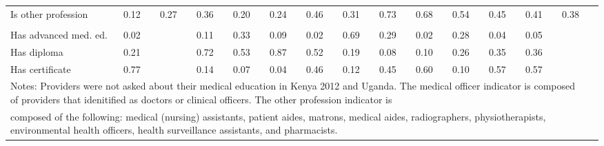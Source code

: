 \begin{tabular}{l*{14}{c}}
Is other profession&           {0.12}&        {0.27}&  {0.36}&  {0.20}&    {0.24}&        {0.46}&        {0.31}&        {0.73}&        {0.68}&        {0.54}&       {0.45}&       {0.41}&       {0.38}\\
&   {}\\
Has advanced med. ed.&         {0.02}&        {}&  {0.11}&  {0.33}&    {0.09}&        {0.02}&        {0.69}&        {0.29}&        {0.02}&        {0.28}&       {0.04}&       {0.05}&       {}\\
Has diploma&                           {0.21}&        {}&  {0.72}&  {0.53}&    {0.87}&        {0.52}&        {0.19}&        {0.08}&        {0.10}&        {0.26}&       {0.35}&       {0.36}&       {}\\
Has certificate&                       {0.77}&        {}&  {0.14}&  {0.07}&    {0.04}&        {0.46}&        {0.12}&        {0.45}&        {0.60}&        {0.10}&       {0.57}&       {0.57}&       {}\\
\hline
\multicolumn{14}{l}{\footnotesize Notes: Providers were not asked about their medical education in Kenya 2012 and Uganda. The medical officer indicator is composed of providers that idenitified as doctors or clinical officers. The other profession indicator is}\\
\multicolumn{14}{l}{\footnotesize composed of the following: medical (nursing) assistants, patient aides, matrons, medical aides, radiographers, physiotherapists, environmental health officers, health surveillance assistants, and pharmacists.}\\
\end{tabular}